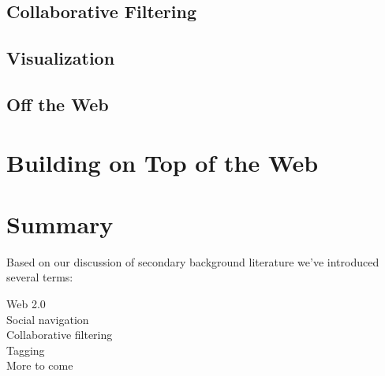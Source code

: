 \subsection{Collaborative Filtering}

\subsection{Visualization}

\subsection{Off the Web}

\section{Building on Top of the Web}

\section{Summary}

Based on our discussion of secondary background literature we've introduced
several terms:

\begin{description}
  \item[Web 2.0]
  \item[Social navigation]
  \item[Collaborative filtering]
  \item[Tagging]
  \item[More to come]
\end{description}
